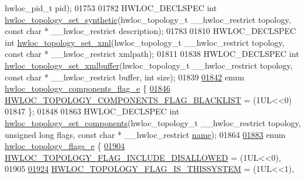 \begin{DoxyCode}
       hwloc\_pid\_t pid);
01753 
01782 HWLOC\_DECLSPEC \textcolor{keywordtype}{int} \hyperlink{a00192_ga4fab186bb6181a00bcf585825fddd38d}{hwloc\_topology\_set\_synthetic}(hwloc\_topology\_t 
      \_\_hwloc\_restrict topology, \textcolor{keyword}{const} \textcolor{keywordtype}{char} * \_\_hwloc\_restrict description);
01783 
01810 HWLOC\_DECLSPEC \textcolor{keywordtype}{int} \hyperlink{a00192_ga879439b7ee99407ee911b3ac64e9a25e}{hwloc\_topology\_set\_xml}(hwloc\_topology\_t \_\_hwloc\_restrict topology,
       \textcolor{keyword}{const} \textcolor{keywordtype}{char} * \_\_hwloc\_restrict xmlpath);
01811 
01838 HWLOC\_DECLSPEC \textcolor{keywordtype}{int} \hyperlink{a00192_ga2745616b65595e1c1e579ecc7e461fa8}{hwloc\_topology\_set\_xmlbuffer}(hwloc\_topology\_t 
      \_\_hwloc\_restrict topology, \textcolor{keyword}{const} \textcolor{keywordtype}{char} * \_\_hwloc\_restrict buffer, \textcolor{keywordtype}{int} size);
01839 
\hyperlink{a00192_ga949f656c779208a36790feba24048b7e}{01842} \textcolor{keyword}{enum} \hyperlink{a00192_ga949f656c779208a36790feba24048b7e}{hwloc\_topology\_components\_flag\_e} \{
\hyperlink{a00192_gga949f656c779208a36790feba24048b7ea33eec25d29253a2aba21dd3c731b416e}{01846}   \hyperlink{a00192_gga949f656c779208a36790feba24048b7ea33eec25d29253a2aba21dd3c731b416e}{HWLOC\_TOPOLOGY\_COMPONENTS\_FLAG\_BLACKLIST} = (1UL<<0)
01847 \};
01848 
01863 HWLOC\_DECLSPEC \textcolor{keywordtype}{int} \hyperlink{a00192_ga9ad41adf418cee1c0ee32ba9bd4a3d36}{hwloc\_topology\_set\_components}(hwloc\_topology\_t 
      \_\_hwloc\_restrict topology, \textcolor{keywordtype}{unsigned} \textcolor{keywordtype}{long} flags, \textcolor{keyword}{const} \textcolor{keywordtype}{char} * \_\_hwloc\_restrict \hyperlink{a00238_abb709ec38f2970677e4e57d1d30be96d}{name});
01864 
\hyperlink{a00193_gada025d3ec20b4b420f8038d23d6e7bde}{01883} \textcolor{keyword}{enum} \hyperlink{a00193_gada025d3ec20b4b420f8038d23d6e7bde}{hwloc\_topology\_flags\_e} \{
\hyperlink{a00193_ggada025d3ec20b4b420f8038d23d6e7bdea10907044bbb306fd0dc76acf046d9258}{01904}   \hyperlink{a00193_ggada025d3ec20b4b420f8038d23d6e7bdea10907044bbb306fd0dc76acf046d9258}{HWLOC\_TOPOLOGY\_FLAG\_INCLUDE\_DISALLOWED} = (1UL<<0),
01905 
\hyperlink{a00193_ggada025d3ec20b4b420f8038d23d6e7bdea6ecb6abc6a0bb75e81564f8bca85783b}{01924}   \hyperlink{a00193_ggada025d3ec20b4b420f8038d23d6e7bdea6ecb6abc6a0bb75e81564f8bca85783b}{HWLOC\_TOPOLOGY\_FLAG\_IS\_THISSYSTEM} = (1UL<<1),

\end{DoxyCode}
